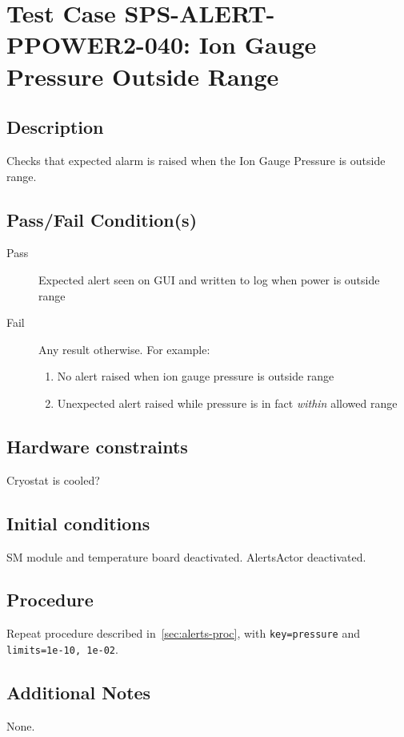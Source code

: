 \section{Test Case SPS-ALERT-PPOWER2-040: Ion Gauge Pressure Outside Range}

\subsection{Description}

Checks that expected alarm is raised when the Ion Gauge Pressure is outside range.

\subsection{Pass/Fail Condition(s)}

\begin{description}
\item [Pass] Expected alert seen on GUI and written to log when power is outside range
\item [Fail] Any result otherwise. For example:

\begin{enumerate}
    \item No alert raised when ion gauge pressure is outside range
    \item Unexpected alert raised while pressure is in fact {\it within} allowed range
\end{enumerate}
\end{description}

\subsection{Hardware constraints}

Cryostat is cooled?

\subsection{Initial conditions}

SM module and temperature board deactivated. AlertsActor deactivated.

\subsection{Procedure}

Repeat procedure described in~\ref{sec:alerts-proc}, with \texttt{key=pressure} and \texttt{limits=1e-10, 
1e-02}.

\subsection{Additional Notes}
None.
